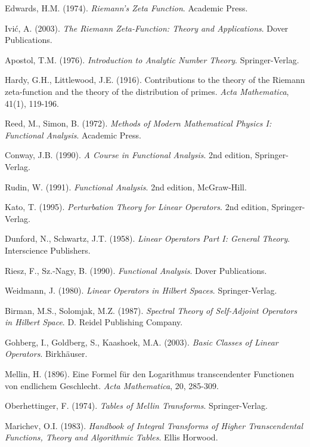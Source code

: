 \documentclass[12pt]{article}
\theoremstyle{plain}
\theoremstyle{definition}
\begin{document}
\begin{thebibliography}{99}
 Edwards, H.M. (1974). \emph{Riemann's Zeta Function}. Academic Press.

 Ivić, A. (2003). \emph{The Riemann Zeta-Function: Theory and Applications}. Dover Publications.

 Apostol, T.M. (1976). \emph{Introduction to Analytic Number Theory}. Springer-Verlag.

 Hardy, G.H., Littlewood, J.E. (1916). Contributions to the theory of the Riemann zeta-function and the theory of the distribution of primes. \emph{Acta Mathematica}, 41(1), 119-196.

 Reed, M., Simon, B. (1972). \emph{Methods of Modern Mathematical Physics I: Functional Analysis}. Academic Press.

 Conway, J.B. (1990). \emph{A Course in Functional Analysis}. 2nd edition, Springer-Verlag.

 Rudin, W. (1991). \emph{Functional Analysis}. 2nd edition, McGraw-Hill.

 Kato, T. (1995). \emph{Perturbation Theory for Linear Operators}. 2nd edition, Springer-Verlag.

 Dunford, N., Schwartz, J.T. (1958). \emph{Linear Operators Part I: General Theory}. Interscience Publishers.

 Riesz, F., Sz.-Nagy, B. (1990). \emph{Functional Analysis}. Dover Publications.

 Weidmann, J. (1980). \emph{Linear Operators in Hilbert Spaces}. Springer-Verlag.

 Birman, M.S., Solomjak, M.Z. (1987). \emph{Spectral Theory of Self-Adjoint Operators in Hilbert Space}. D. Reidel Publishing Company.

 Gohberg, I., Goldberg, S., Kaashoek, M.A. (2003). \emph{Basic Classes of Linear Operators}. Birkhäuser.

 Mellin, H. (1896). Eine Formel für den Logarithmus transcendenter Functionen von endlichem Geschlecht. \emph{Acta Mathematica}, 20, 285-309.

 Oberhettinger, F. (1974). \emph{Tables of Mellin Transforms}. Springer-Verlag.

 Marichev, O.I. (1983). \emph{Handbook of Integral Transforms of Higher Transcendental Functions, Theory and Algorithmic Tables}. Ellis Horwood.


\end{thebibliography}
\end{document}

